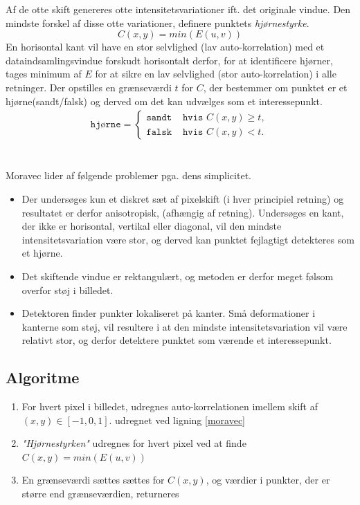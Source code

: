 Af de otte skift genereres otte intensitetsvariationer ift. det originale vindue. Den mindste forskel af disse otte variationer, definere punktets \textit{hjørnestyrke}.
$$
C(x,y)=min(E(u,v))
$$
En horisontal kant vil have en stor selvlighed (lav auto-korrelation) med et dataindsamlingsvindue forskudt horisontalt derfor, for at identificere hjørner, tages minimum af $E$ for at sikre en lav selvlighed (stor auto-korrelation) i alle retninger. 
Der opstilles en grænseværdi $t$ for $C$, der bestemmer om punktet er et hjørne(sandt/falsk) og derved om det kan udvælges som et interessepunkt.
\begin{equation}
\begin{split}
\texttt{hjørne} = 
\begin{cases}
\texttt{sandt}& \texttt{hvis } C(x,y)\geq t, \\
\texttt{falsk }& \texttt{hvis } C(x,y) < t.
\end{cases}
\end{split}
\label{cornerind}
\end{equation}
 \\ \\
Moravec lider af følgende problemer pga. dens simplicitet. 
\begin{itemize}
\item{Der undersøges kun et diskret sæt af pixelskift (i hver principiel retning) og resultatet er derfor anisotropisk, (afhængig af retning). Undersøges en kant, der ikke er horisontal, vertikal eller diagonal, vil den mindste intensitetsvariation være stor, og derved kan punktet fejlagtigt detekteres som et hjørne.}
\item{Det skiftende vindue er rektangulært, og metoden er derfor meget følsom overfor støj i billedet.}
\item{Detektoren finder punkter lokaliseret på kanter. Små deformationer i kanterne som støj, vil resultere i at den mindste intensitetsvariation vil være relativt stor, og derfor detektere punktet som værende et interessepunkt.}
\end{itemize}
\subsection{Algoritme}
\begin{enumerate}
\item{For hvert pixel i billedet, udregnes auto-korrelationen imellem skift af $(x,y) \in [-1,0,1]$. udregnet ved ligning \ref{moravec}}
\item{\textit{"Hjørnestyrken"} udregnes for hvert pixel ved at finde $C(x,y)=min(E(u,v))$}
\item{En grænseværdi sættes sættes for $C(x,y)$, og værdier i punkter, der er større end grænseværdien, returneres}
\end{enumerate}

